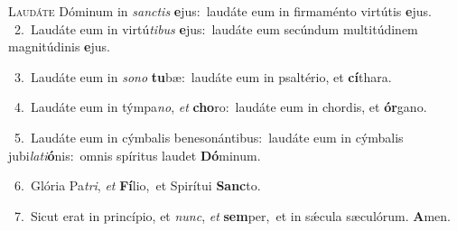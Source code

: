 \lettrine{\initial\textcolor{\initialcolor}{L}}{audáte} Dóminum in \textit{sanc}\-\textit{tis} \textbf{e}\-jus:~\star laudáte eum in firmaménto virtútis \textbf{e}\-jus.\\
{\numbfont\textcolor{\numbcolor}{~2.}}~Laudáte eum in virtú\-\textit{ti}\-\textit{bus} \textbf{e}\-jus:~\star laudáte eum secúndum multitúdinem magnitúdinis \textbf{e}\-jus.\par
{\numbfont\textcolor{\numbcolor}{~3.}}~Laudáte eum in \textit{so}\-\textit{no} \textbf{tu}\-bæ:~\star laudáte eum in psaltério, et \textbf{cí}\-thara.\par
{\numbfont\textcolor{\numbcolor}{~4.}}~Laudáte eum in týmpa\-\textit{no}\-, \textit{et} \textbf{cho}\-ro:~\star laudáte eum in chordis, et \textbf{ór}\-gano.\par
{\numbfont\textcolor{\numbcolor}{~5.}}~Laudáte eum in cýmbalis benesonántibus:~\dagger laudáte eum in cýmbalis jubi\-\textit{la}\-\textit{ti}\textbf{ó}nis:~\star omnis spíritus laudet \textbf{Dó}\-minum.\par
{\numbfont\textcolor{\numbcolor}{~6.}}~Glória Pa\-\textit{tri}\-, \textit{et} \textbf{Fí}\-lio,~\star et Spirítui \textbf{Sanc}\-to.\par
{\numbfont\textcolor{\numbcolor}{~7.}}~Sicut erat in princípio, et \textit{nunc}\-, \textit{et} \textbf{sem}\-per,~\star et in sǽcula sæculórum. \textbf{A}\-men.\par
